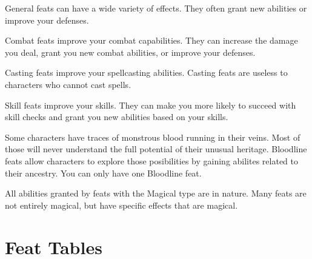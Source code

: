          General feats can have a wide variety of effects.
        They often grant new abilities or improve your defenses.

         Combat feats improve your combat capabilities.
        They can increase the damage you deal, grant you new combat abilities, or improve your defenses.

         Casting feats improve your spellcasting abilities.
        Casting feats are useless to characters who cannot cast spells.

         Skill feats improve your skills.
        They can make you more likely to succeed with skill checks and grant you new abilities based on your skills.

         Some characters have traces of monstrous blood running in their veins.
        Most of those will never understand the full potential of their unusual heritage.
        Bloodline feats allow characters to explore those posibilities by gaining abilites related to their ancestry.
        You can only have one Bloodline feat.

        All abilities granted by feats with the Magical type are  in nature.
        Many feats are not entirely magical, but have specific effects that are magical.

\section{Feat Tables}

